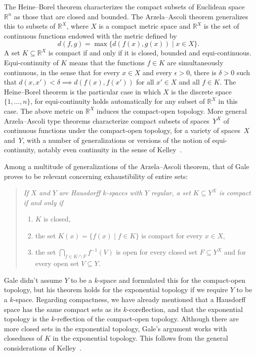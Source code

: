 \documentclass{LMCS}
\newcommand{\R}{\mathbb{R}}
\begin{document}
The Heine--Borel theorem characterizes the compact subsets of
Euclidean space~$\R^n$ as those that are closed and bounded. The
Arzela--Ascoli theorem generalizes this to subsets of $\R^X$, where
$X$ is a compact metric space and $\R^X$ is the set of continuous
functions endowed with the metric defined by \[ d(f,g)=\max \{
d(f(x),g(x)) \mid x \in X\}.\] A set $K \subseteq \R^X$ is compact if
and only if it is closed, bounded and equi-continuous.
Equi-continuity of $K$ means that the functions $f \in K$ are
simultaneously continuous, in the sense that for every $x \in X$ and
every $\epsilon>0$, there is $\delta>0$ such that $d(x,x') < \delta
\implies d(f(x),f(x'))$ for all $x' \in X$ and all $f \in K$. The
Heine--Borel theorem is the particular case in which $X$ is the
discrete space $\{1,\dots,n\}$, for equi-continuity holds
automatically for any subset of $\R^X$ in this case.  The above metric
on $\R^X$ induces the compact-open topology. More general
Arzela--Ascoli type theorems characterize compact subsets of
spaces~$Y^X$ of continuous functions under the compact-open topology,
for a variety of spaces~$X$ and~$Y$, with a number of generalizations
or versions of the notion of equi-continuity, notably even continuity
in the sense of Kelley~\cite{kelley}.

Among a multitude of generalizations of the Arzela--Ascoli theorem,
that of Gale~\cite[Theorem 1]{gale} proves to be relevant concerning
exhaustibility of entire sets:
\pagebreak[3]
\begin{quote}
\em
  If $X$ and $Y$ are Hausdorff $k$-spaces with $Y$ regular, 
a set $K \subseteq Y^X$ is compact 
  if and only if
  \begin{enumerate}
  \item $K$ is closed,
  \item the set $K(x)=\{f(x) \mid f \in K\}$ is compact for every $x \in X$,
  \item the set $\bigcap_{f \in K \cap F} f^{-1}(V)$ is open for every
    closed set $F \subseteq Y^X$ and for every open set $V \subseteq Y$.
  \end{enumerate}
\end{quote}
Gale didn't assume $Y$ to be a $k$-space and formulated this for the
compact-open topology, but his theorem holds for the exponential
topology if we require $Y$ to be a $k$-space.  Regarding compactness,
we have already mentioned that a Hausdorff space has the same compact
sets as its $k$-coreflection, and that the exponential topology is the
$k$-reflection of the compact-open topology. Although there are more
closed sets in the exponential topology, Gale's argument works with
closedness of $K$ in the exponential topology. This follows
from the general considerations of Kelley~\cite[Chapter 7]{kelley}.
\end{document}
